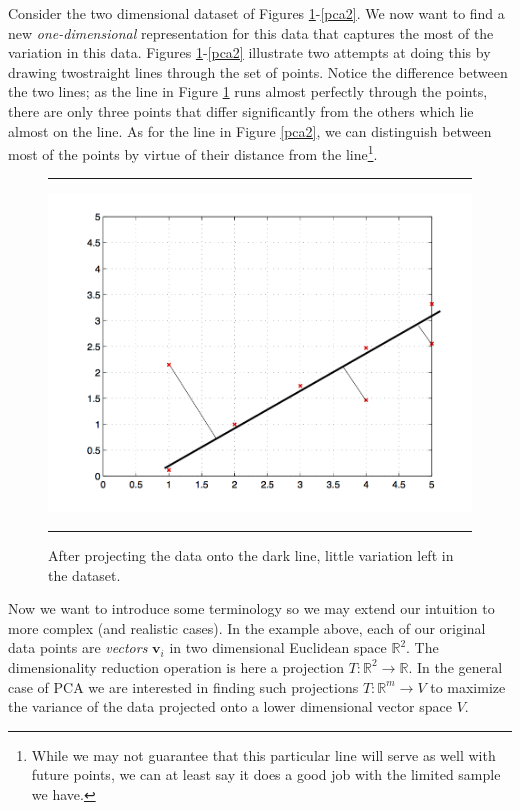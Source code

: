 \documentclass[11pt, oneside, a4paper]{report}
\begin{document}
Consider the two dimensional dataset of Figures
\ref{pca1}-\ref{pca2}. We now want to find a new
\emph{one-dimensional} representation for
this data that captures the most of the variation in this data. Figures
\ref{pca1}-\ref{pca2} illustrate two attempts at doing this by drawing
twostraight lines through the set of points. Notice the difference
between the two lines; as the line in Figure \ref{pca1} runs
almost perfectly through the points, there are only three points that
differ significantly from the others which lie almost on the line. As for
the line in Figure \ref{pca2}, we can distinguish between most of the
points by virtue of their distance from the line\footnote{ While we may not
guarantee that this particular line will serve as well with future
points, we can at least say it does a good job with the limited sample
we have.}.

\begin{figure}
  \centering
  \hrule
  \includegraphics[width = .9\textwidth]{Figures/pca1.png}
  \hrule
  \caption{After projecting the data onto the dark line, little
    variation left in the dataset.}
  \label{pca1}
\end{figure}

Now we want to introduce some terminology so we may extend our
intuition to more complex (and realistic cases). In the example above,
each of our original data points are \emph{vectors} $\mathbf{v}_i$ in two
dimensional Euclidean space $\mathbb{R}^2$. The dimensionality
reduction operation is here a projection $T:
\mathbb{R}^2\rightarrow\mathbb{R}$. In the general case of PCA we are
interested in finding such projections $T:
\mathbb{R}^m\rightarrow V$ to maximize the variance of the data
projected onto a lower dimensional vector space $V$.
\end{document}
